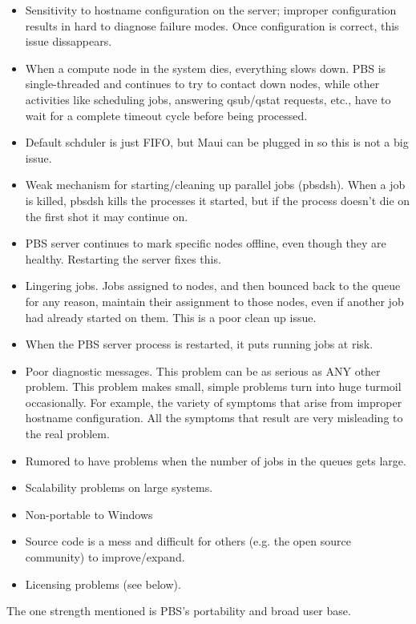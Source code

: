 \begin{itemize}
\item Sensitivity to hostname configuration on the server; improper 
      configuration results in hard to diagnose failure modes.  Once 
      configuration is correct, this issue dissappears.
\item When a compute node in the system dies, everything slows down.  
      PBS is single-threaded and continues to try to contact down nodes,
      while other activities like scheduling jobs, answering qsub/qstat 
      requests, etc., have to wait for a complete timeout cycle before being
      processed.
\item Default schduler is just FIFO, but Maui can be plugged in so this
      is not a big issue.
\item Weak mechanism for starting/cleaning up parallel jobs (pbsdsh).
      When a job is killed, pbsdsh kills the processes it started, but
      if the process doesn't die on the first shot it may continue on.
\item PBS server continues to mark specific nodes offline, even though they 
      are healthy.  Restarting the server fixes this.
\item Lingering jobs.  Jobs assigned to nodes, and then bounced back to the 
      queue for any reason, maintain their assignment to those nodes, even 
      if another job had already started on them.  This is a poor clean up 
      issue.
\item When the PBS server process is restarted, it puts running jobs at risk.
\item Poor diagnostic messages.  This problem can be as serious as ANY other 
      problem.  This problem makes small, simple problems turn into huge 
      turmoil occasionally.  For example, the variety of symptoms that arise 
      from improper hostname configuration.  All the symptoms that result are 
      very misleading to the real problem.
\item Rumored to have problems when the number of jobs in the queues gets
      large.
\item Scalability problems on large systems.
\item Non-portable to Windows
\item Source code is a mess and difficult for others (e.g. the open source
      community) to improve/expand.
\item Licensing problems (see below).
\end{itemize}
The one strength mentioned is PBS's portability and broad user base.

